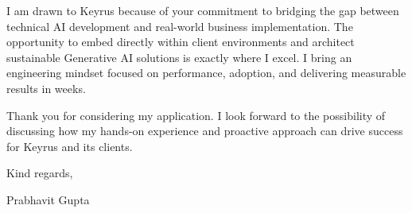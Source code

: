 \documentclass[11pt,a4paper]{article}
\begin{document}
I am drawn to Keyrus because of your commitment to bridging the gap between technical AI development and real-world business implementation. The opportunity to embed directly within client environments and architect sustainable Generative AI solutions is exactly where I excel. I bring an engineering mindset focused on performance, adoption, and delivering measurable results in weeks.

Thank you for considering my application. I look forward to the possibility of discussing how my hands-on experience and proactive approach can drive success for Keyrus and its clients.

\vspace{4mm}
Kind regards,

\vspace{4mm}
Prabhavit Gupta
\end{document}
